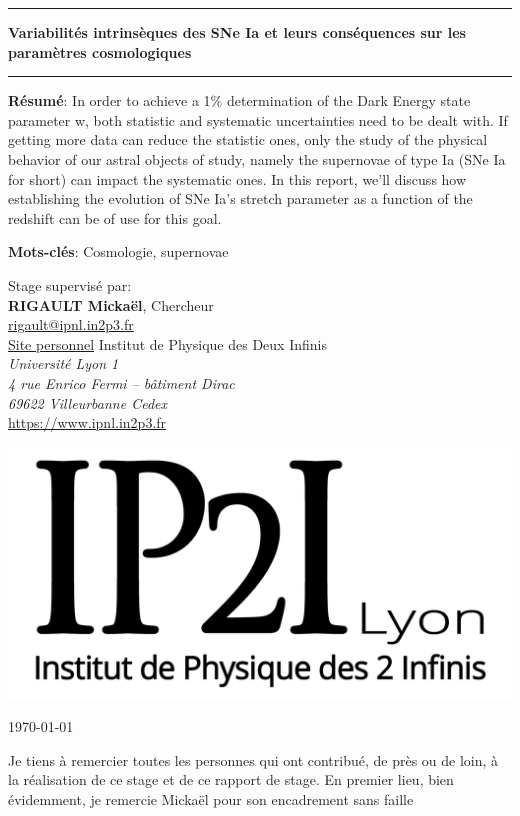 \documentclass[a4paper, 12pt, svgnames]{article}
\begin{document}
\begin{center}\vfill\hrule\vspace*{8pt}

\textbf{\huge Variabilités intrinsèques des SNe Ia et leurs conséquences sur les
paramètres cosmologiques}\\

\hrule\vfill

\parbox{15cm}{\small\textbf{Résumé}:
In order to achieve a 1\% determination of the Dark Energy state parameter w,
both statistic and systematic uncertainties need to be dealt with. If getting
more data can reduce the statistic ones, only the study of the physical behavior
of our astral objects of study, namely the supernovae of type Ia (SNe Ia for
short) can impact the systematic ones. In this report, we'll discuss how
establishing the evolution of SNe Ia's stretch parameter as a function of the
redshift can be of use for this goal.}\vspace{0.5cm}

\parbox{15cm}{\small\textbf{Mots-clés}:
Cosmologie, supernovae}\vspace{0.5cm}

\parbox{15cm}{Stage supervisé par:\\
\textbf{\textsc{RIGAULT} Mickaël}, Chercheur\\
\href{mailto:rigault@ipnl.in2p3.fr}{rigault@ipnl.in2p3.fr}\\
\href{https://www.ipnl.in2p3.fr/perso/rigault/}{Site personnel}\bigbreak
Institut de Physique des Deux Infinis\\
{\textit{Université Lyon 1\\4 rue Enrico Fermi -- bâtiment Dirac\\
69622 Villeurbanne Cedex}}\\
\url{https://www.ipnl.in2p3.fr}}\vspace{.5cm}\vfill

\includegraphics[width=.3\textwidth]{General_figures/IP2I.png}
\end{center}\vfill \hfill \today
\newpage
\thispagestyle{empty}
\setcounter{page}{0}


Je tiens à remercier toutes les personnes qui ont contribué, de près ou de loin,
à la réalisation de ce stage et de ce rapport de stage. En premier lieu, bien
évidemment, je remercie Mickaël  pour son encadrement sans faille
\end{document}
